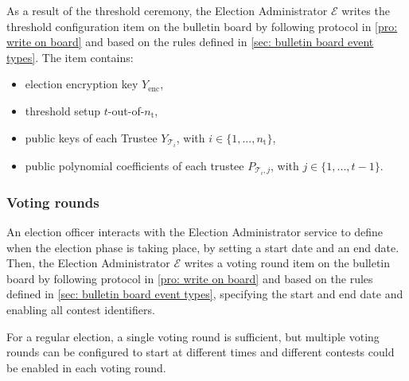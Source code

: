 As a result of the threshold ceremony, the Election Administrator $\mathcal{E}$ writes the threshold configuration item on the bulletin board by following protocol in \cref{pro: write on board} and based on the rules defined in \cref{sec: bulletin board event types}. The item contains:
\begin{itemize}
    \item election encryption key $Y_\mathrm{enc}$,
    \item threshold setup $t$-out-of-$n_\mathrm{t}$,
    \item public keys of each Trustee $Y_{\mathcal{T}_i}$, with $i \in \{1, ..., n_\mathrm{t}\}$,
    \item public polynomial coefficients of each trustee $P_{\mathcal{T}_i,j}$, with $j \in \{1, ..., t-1 \}$.
\end{itemize}


\subsubsection{Voting rounds} \label{sec: voting rounds}
An election officer interacts with the Election Administrator service to define when the election phase is taking place, by setting a start date and an end date. Then, the Election Administrator $\mathcal{E}$ writes a voting round item on the bulletin board by following protocol in \cref{pro: write on board} and based on the rules defined in \cref{sec: bulletin board event types}, specifying the start and end date and enabling all contest identifiers.

For a regular election, a single voting round is sufficient, but multiple voting rounds can be configured to start at different times and different contests could be enabled in each voting round.
